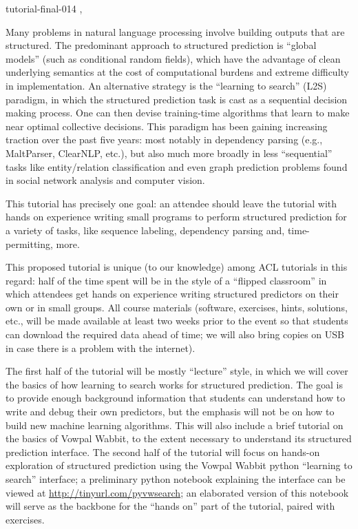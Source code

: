 \begin{tutorial}
  {tutorial-final-014}
  {\daydateyear, \tutorialmorningtime}
  {\TutLocA}

Many problems in natural language processing involve building outputs that are structured. The predominant approach to structured prediction is ``global models'' (such as conditional random fields), which have the advantage of clean underlying semantics at the cost of computational burdens and extreme difficulty in implementation. An alternative strategy is the ``learning to search'' (L2S) paradigm, in which the structured prediction task is cast as a sequential decision making process. One can then devise training-time algorithms that learn to make near optimal collective decisions. This paradigm has been gaining increasing traction over the past five years: most notably in dependency parsing (e.g., MaltParser, ClearNLP, etc.), but also much more broadly in less ``sequential'' tasks like entity/relation classification and even graph prediction problems found in social network analysis and computer vision.

This tutorial has precisely one goal: an attendee should leave the tutorial with hands on experience writing small programs to perform structured prediction for a variety of tasks, like sequence labeling, dependency parsing and, time-permitting, more.

This proposed tutorial is unique (to our knowledge) among ACL tutorials in this regard: half of the time spent will be in the style of a ``flipped classroom'' in which attendees get hands on experience writing structured predictors on their own or in small groups. All course materials (software, exercises, hints, solutions, etc., will be made available at least two weeks prior to the event so that students can download the required data ahead of time; we will also bring copies on USB in case there is a problem with the internet).

The first half of the tutorial will be mostly ``lecture'' style, in which we will cover the basics of how learning to search works for structured prediction. The goal is to provide enough background information that students can understand how to write and debug their own predictors, but the emphasis will not be on how to build new machine learning algorithms. This will also include a brief tutorial on the basics of Vowpal Wabbit, to the extent necessary to understand its structured prediction interface. The second half of the tutorial will focus on hands-on exploration of structured prediction using the Vowpal Wabbit python ``learning to search'' interface; a preliminary python notebook explaining the interface can be viewed at \url{http://tinyurl.com/pyvwsearch}; an elaborated version of this notebook will serve as the backbone for the ``hands on'' part of the tutorial, paired with exercises.

\end{tutorial}
